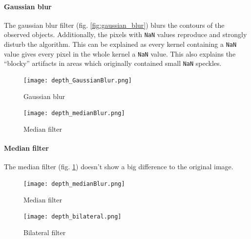 \documentclass[DIV12,a4paper]{scrartcl}
\begin{document}
\paragraph{Gaussian blur}
The gaussian blur filter (fig. \ref{fig:gaussian_blur}) blurs the contours of the observed objects. Additionally, the pixels with \texttt{NaN} values reproduce and strongly disturb the algorithm. This can be explained as every kernel containing a \texttt{NaN} value gives every pixel in the whole kernel a \texttt{NaN} value. This also explains the ``blocky'' artifacts in areas which originally contained small \texttt{NaN} speckles.
\begin{figure}[h!tbp]
  \centering
  \begin{minipage}{.5\textwidth}
    \centering
    \texttt{[image: depth\_GaussianBlur.png]}
    \caption{Gaussian blur}
    \label{fig:gaussian_blur}
  \end{minipage}%
  \begin{minipage}{.5\textwidth}
    \centering
    \texttt{[image: depth\_medianBlur.png]}
    \caption{Median filter}
    \label{fig:median_depth}
  \end{minipage}
\end{figure}

\paragraph{Median filter}
The median filter (fig. \ref{fig:median_depth}) doesn't show a big difference to the original image.
\begin{figure}[h!tbp]
  \begin{minipage}{.5\textwidth}
  \centering
  \texttt{[image: depth\_medianBlur.png]}
  \caption{Median filter}
  \label{fig:median_depth}
\end{minipage}%
\begin{minipage}{.5\textwidth}
  \centering
  \texttt{[image: depth\_bilateral.png]}
  \caption{Bilateral filter}
  \label{fig:bilateral_depth}
\end{minipage}
\end{figure}
\end{document}

